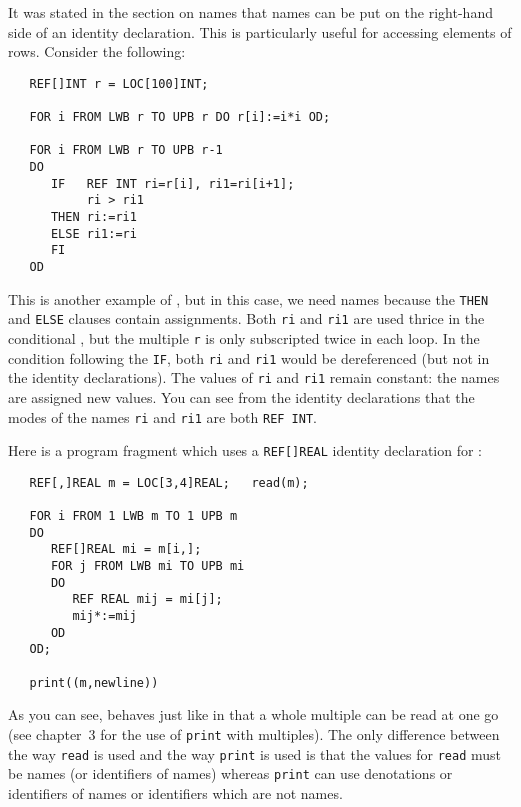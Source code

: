 It was stated in the section on names that names can be put on the
right-hand side of an identity declaration.  This is particularly
useful for accessing elements of rows.  Consider the following:
\begin{verbatim}
   REF[]INT r = LOC[100]INT;

   FOR i FROM LWB r TO UPB r DO r[i]:=i*i OD;

   FOR i FROM LWB r TO UPB r-1
   DO
      IF   REF INT ri=r[i], ri1=ri[i+1];
           ri > ri1
      THEN ri:=ri1
      ELSE ri1:=ri
      FI
   OD
\end{verbatim}
\noindent
This is another example of , but in
this case, we need names because the \verb|THEN| and \verb|ELSE|
clauses contain assignments. Both \verb|ri| and \verb|ri1| are used
thrice in the conditional , but the
multiple \verb|r| is only subscripted twice in each loop. In the
condition following the \verb|IF|, both \verb|ri| and \verb|ri1| would
be dereferenced (but not in the identity declarations).  The values of
\verb|ri| and \verb|ri1| remain constant: the names are assigned new
values.  You can see from the identity declarations that the modes of
the names \verb|ri| and \verb|ri1| are both \verb|REF INT|.

Here is a program fragment which uses a \verb|REF[]REAL| identity
declaration for :
\begin{verbatim}
   REF[,]REAL m = LOC[3,4]REAL;   read(m);
   
   FOR i FROM 1 LWB m TO 1 UPB m
   DO
      REF[]REAL mi = m[i,];
      FOR j FROM LWB mi TO UPB mi
      DO
         REF REAL mij = mi[j];
         mij*:=mij
      OD
   OD;
   
   print((m,newline))
\end{verbatim}
\noindent
As you can see,  behaves just like
 in that a whole multiple can be read
at one go (see chapter~3 for the use of \verb|print| with multiples).
The only difference between the way \verb|read| is used and the way
\verb|print| is used is that the values for \verb|read| must be names
(or identifiers of names) whereas \verb|print| can use denotations or
identifiers of names or identifiers which are not names.

